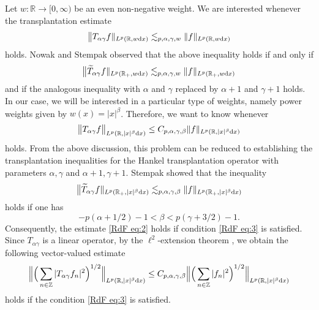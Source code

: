 \documentclass[11pt,oneside]{amsart}
\numberwithin{equation}{section}
\theoremstyle{definition}
\newcommand{\RR}{\mathbb{R}}
\newcommand{\ZZ}{\mathbb{Z}}
\begin{document}
Let $w\colon\RR\to[0,\infty)$ be an even non-negative weight. We are interested whenever the transplantation estimate
\begin{equation*}
    \big\|T_{\alpha\gamma}f\|_{L^p(\RR,w{\rm d}x)}\lesssim_{p,\alpha,\gamma, w}\|f\|_{L^p(\RR,w{\rm d}x)}
\end{equation*}
holds. Nowak and Stempak \cite[Proposition 2.1]{NowakStempak} observed that the above inequality holds if and only if 
\begin{equation*}
    \big\| \widetilde{T}_{\alpha\gamma}f\|_{L^p(\RR_+,w{\rm d}x)}\lesssim_{p,\alpha,\gamma, w}\|f\|_{L^p(\RR_+,w{\rm d}x)}
\end{equation*}
and if the analogous inequality with $\alpha$ and $\gamma$ replaced by $\alpha+1$ and $\gamma+1$ holds. In our case, we will be interested in a particular type of weights, namely power weights given by $w(x)=|x|^\beta$. Therefore, we want to know whenever
\begin{equation}\label{RdF eq:2}
    \big\|T_{\alpha\gamma} f\big\|_{L^p(\RR,|x|^\beta{\rm d}x)}\leq C_{p,\alpha,\gamma,\beta}\|f\|_{L^p(\RR,|x|^\beta{\rm d}x)}
\end{equation}
holds. From the above discussion, this problem can be reduced to establishing the transplantation inequalities for the Hankel transplantation operator with parameters $\alpha, \gamma$ and $\alpha+1, \gamma+1$. Stempak \cite[Collorary 1.4]{Stempak2002} showed that the inequality 
\begin{equation*}
    \big\| \widetilde{T}_{\alpha\gamma}f\|_{L^p(\RR_+,|x|^\beta{\rm d}x)}\lesssim_{p,\alpha,\gamma, \beta}\|f\|_{L^p(\RR_+,|x|^\beta{\rm d}x)}
\end{equation*}
holds if one has
\begin{equation}\label{RdF eq:3}
-p(\alpha+1/2)-1<\beta<p(\gamma+3/2)-1.
\end{equation}
Consequently, the estimate \eqref{RdF eq:2} holds if condition \eqref{RdF eq:3} is satisfied. Since $T_{\alpha\gamma}$ is a linear operator, by the $\ell^2$-extension theorem \cite[Theorem 5.5.1]{Grafakos}, we obtain the following vector-valued estimate
\begin{equation}\label{VVTRANS:eq4}
\Big\|\Big(\sum_{n\in\ZZ}|T_{\alpha\gamma}f_n|^2\Big)^{1/2}\Big\|_{L^p(\RR,|x|^\beta{\rm d}x)}\leq C_{p,\alpha,\gamma, \beta}\Big\|\Big(\sum_{n\in\ZZ}|f_n|^2\Big)^{1/2}\Big\|_{L^p(\RR,|x|^\beta{\rm d}x)}
\end{equation}
holds if the condition \eqref{RdF eq:3} is satisfied.
\end{document}
